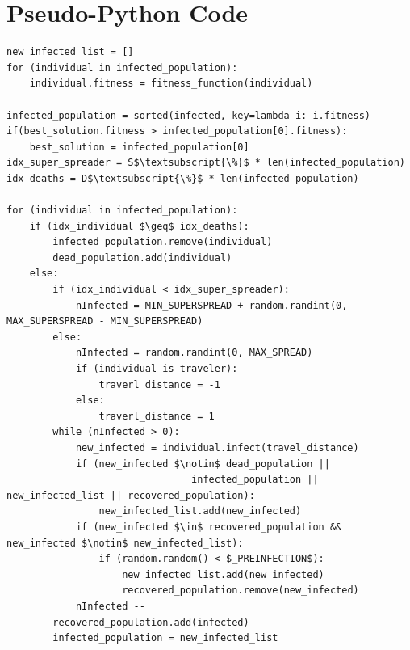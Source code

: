 \documentclass[letterpaper]{article}%
\begin{document}
\section{Pseudo-Python Code}
\lstset{language=Python}
\lstset{frame=lines}
\lstset{basicstyle=\footnotesize}
\lstset{showstringspaces=false}
\lstset{numbers=left}					%
\lstset{stepnumber=1}
\begin{lstlisting}[mathescape=true]
new_infected_list = []
for (individual in infected_population):
    individual.fitness = fitness_function(individual)

infected_population = sorted(infected, key=lambda i: i.fitness)
if(best_solution.fitness > infected_population[0].fitness):
    best_solution = infected_population[0]
idx_super_spreader = S$\textsubscript{\%}$ * len(infected_population)
idx_deaths = D$\textsubscript{\%}$ * len(infected_population)

for (individual in infected_population):
    if (idx_individual $\geq$ idx_deaths):
        infected_population.remove(individual)
        dead_population.add(individual)
    else:
        if (idx_individual < idx_super_spreader):
            nInfected = MIN_SUPERSPREAD + random.randint(0, MAX_SUPERSPREAD - MIN_SUPERSPREAD)
        else:
            nInfected = random.randint(0, MAX_SPREAD)
            if (individual is traveler):
                traverl_distance = -1
            else: 
                traverl_distance = 1
        while (nInfected > 0):
            new_infected = individual.infect(travel_distance)
            if (new_infected $\notin$ dead_population || 
                                infected_population || new_infected_list || recovered_population): 
                new_infected_list.add(new_infected)
            if (new_infected $\in$ recovered_population && new_infected $\notin$ new_infected_list): 
                if (random.random() < $_PREINFECTION$): 
                    new_infected_list.add(new_infected)
                    recovered_population.remove(new_infected)
            nInfected --
        recovered_population.add(infected) 
        infected_population = new_infected_list
\end{lstlisting}
\lstset{language=Python}
\lstset{frame=lines}
\lstset{basicstyle=\footnotesize}
\lstset{showstringspaces=false}
\lstset{numbers=left}				
\lstset{stepnumber=1}
\end{document}
